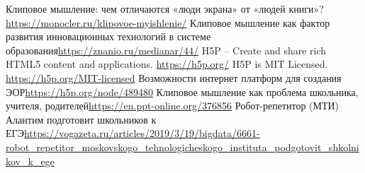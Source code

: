 \documentclass[10pt, a5paper]{article}
\begin{document}
\begin{thebibliography}{9}
 {{Клиповое мышление: чем отличаются «люди экрана» от «людей книги»?} \url{https://monocler.ru/klipovoe-myishlenie/}}
 {{Клиповое мышление как фактор развития инновационных технологий в системе  образования}\url{https://znanio.ru/medianar/44/}}
 {H5P -- Create and share rich HTML5 content and applications. \url{https://h5p.org/}}
 {H5P is MIT Licensed. \url{https://h5p.org/MIT-licensed}}
 {{Возможности интернет платформ для создания ЭОР}\url{https://h5p.org/node/489480}}
 {{Клиповое мышление как проблема школьника, учителя, родителей}\url{https://en.ppt-online.org/376856}}
 {{Робот-репетитор (МТИ) Алантим подготовит школьников к ЕГЭ}\url{https://vogazeta.ru/articles/2019/3/19/bigdata/6661-robot_repetitor_moskovskogo_tehnologicheskogo_instituta_podgotovit_shkolnikov_k_ege}}\end{thebibliography}
\end{document}

